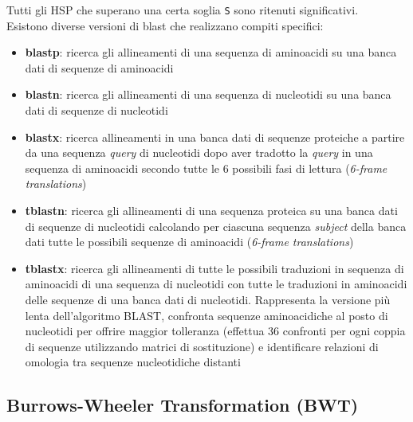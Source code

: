 \documentclass[conference]{IEEEtran}
\begin{document}
Tutti gli HSP che superano una certa soglia \texttt{S} sono ritenuti significativi.\\

Esistono diverse versioni di blast che realizzano compiti specifici:
\begin{itemize}
	\item \textbf{blastp}: ricerca gli allineamenti di una sequenza di aminoacidi su una banca dati di sequenze di aminoacidi
	\item \textbf{blastn}: ricerca gli allineamenti di una sequenza di nucleotidi su una banca dati di sequenze di nucleotidi
	\item \textbf{blastx}: ricerca allineamenti in una banca dati di sequenze proteiche a partire da una sequenza \textit{query} di nucleotidi dopo aver tradotto la \textit{query} in una sequenza di aminoacidi secondo tutte le 6 possibili fasi di lettura (\textit{6-frame translations})
	\item \textbf{tblastn}: ricerca gli allineamenti di una sequenza proteica su una banca dati di sequenze di nucleotidi calcolando per ciascuna sequenza \textit{subject} della banca dati tutte le possibili sequenze di aminoacidi (\textit{6-frame translations})
	\item \textbf{tblastx}: ricerca gli allineamenti di tutte le possibili traduzioni in sequenza di aminoacidi di una sequenza di nucleotidi con tutte le traduzioni in aminoacidi delle sequenze di una banca dati di nucleotidi. Rappresenta la versione più lenta dell'algoritmo BLAST, confronta sequenze aminoacidiche al posto di nucleotidi per offrire maggior tolleranza (effettua 36 confronti per ogni coppia di sequenze utilizzando matrici di sostituzione) e identificare relazioni di omologia tra sequenze nucleotidiche distanti
\end{itemize}

	\subsection{Burrows-Wheeler Transformation (BWT)}\label{sec:Burrows-Wheeler Transformation (BWT)}
\end{document}

